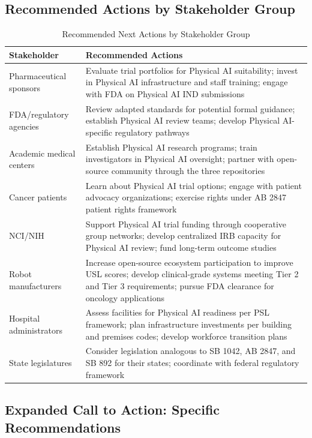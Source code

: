 \subsection{Recommended Actions by Stakeholder Group}
\label{subsec:conclusion-recommendations}

\begin{table}[H]
\centering
\caption{Recommended Next Actions by Stakeholder Group}
\label{tab:recommended-actions}
\small
\begin{tabularx}{\textwidth}{l X}
\toprule
\textbf{Stakeholder} & \textbf{Recommended Actions} \\
\midrule
Pharmaceutical sponsors & Evaluate trial portfolios for Physical AI suitability; invest in Physical AI infrastructure and staff training; engage with FDA on Physical AI IND submissions \\
FDA/regulatory agencies & Review adapted standards for potential formal guidance; establish Physical AI review teams; develop Physical AI-specific regulatory pathways \\
Academic medical centers & Establish Physical AI research programs; train investigators in Physical AI oversight; partner with open-source community through the three repositories \\
Cancer patients & Learn about Physical AI trial options; engage with patient advocacy organizations; exercise rights under AB 2847 patient rights framework \\
NCI/NIH & Support Physical AI trial funding through cooperative group networks; develop centralized IRB capacity for Physical AI review; fund long-term outcome studies \\
Robot manufacturers & Increase open-source ecosystem participation to improve USL scores; develop clinical-grade systems meeting Tier 2 and Tier 3 requirements; pursue FDA clearance for oncology applications \\
Hospital administrators & Assess facilities for Physical AI readiness per PSL framework; plan infrastructure investments per building and premises codes; develop workforce transition plans \\
State legislatures & Consider legislation analogous to SB 1042, AB 2847, and SB 892 for their states; coordinate with federal regulatory framework \\
\bottomrule
\end{tabularx}
\end{table}

\subsection{Expanded Call to Action: Specific Recommendations}
\label{subsec:conclusion-expanded-action}


